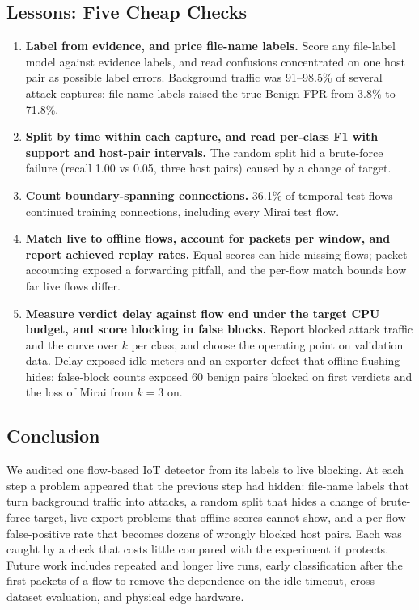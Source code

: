 \subsection{Lessons: Five Cheap Checks}\label{sec:lessons}

\begin{enumerate}
\item \textbf{Label from evidence, and price file-name labels.} Score any file-label model against evidence labels, and read confusions concentrated on one host pair as possible label errors. Background traffic was 91--98.5\% of several attack captures; file-name labels raised the true Benign FPR from 3.8\% to 71.8\%.
\item \textbf{Split by time within each capture, and read per-class F1 with support and host-pair intervals.} The random split hid a brute-force failure (recall 1.00 vs 0.05, three host pairs) caused by a change of target.
\item \textbf{Count boundary-spanning connections.} 36.1\% of temporal test flows continued training connections, including every Mirai test flow.
\item \textbf{Match live to offline flows, account for packets per window, and report achieved replay rates.} Equal scores can hide missing flows; packet accounting exposed a forwarding pitfall, and the per-flow match bounds how far live flows differ.
\item \textbf{Measure verdict delay against flow end under the target CPU budget, and score blocking in false blocks.} Report blocked attack traffic and the curve over $k$ per class, and choose the operating point on validation data. Delay exposed idle meters and an exporter defect that offline flushing hides; false-block counts exposed 60 benign pairs blocked on first verdicts and the loss of Mirai from $k=3$ on.
\end{enumerate}

\subsection{Conclusion}

We audited one flow-based IoT detector from its labels to live blocking. At each step a problem appeared that the previous step had hidden: file-name labels that turn background traffic into attacks, a random split that hides a change of brute-force target, live export problems that offline scores cannot show, and a per-flow false-positive rate that becomes dozens of wrongly blocked host pairs. Each was caught by a check that costs little compared with the experiment it protects. Future work includes repeated and longer live runs, early classification after the first packets of a flow to remove the dependence on the idle timeout, cross-dataset evaluation, and physical edge hardware.

